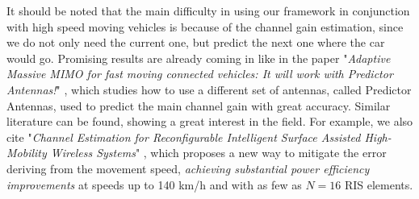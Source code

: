 It should be noted that the main difficulty in using our framework in conjunction with high speed moving vehicles is because of the channel gain estimation, since we do not only need the current one, but predict the next one where the car would go. Promising results are already coming in like in the paper "\textit{Adaptive Massive MIMO for fast moving connected vehicles: It will work with Predictor Antennas!}" \cite{8385489}, which studies how to use a different set of antennas, called Predictor Antennas, used to predict the main channel gain with great accuracy. Similar literature can be found, showing a great interest in the field. For example, we also cite "\textit{Channel Estimation for Reconfigurable Intelligent Surface Assisted High-Mobility Wireless Systems}" \cite{9875062}, which proposes a new way to mitigate the error deriving from the movement speed, \textit{achieving substantial power efficiency improvements} at speeds up to 140 km/h and with as few as $N=16$ RIS elements.
